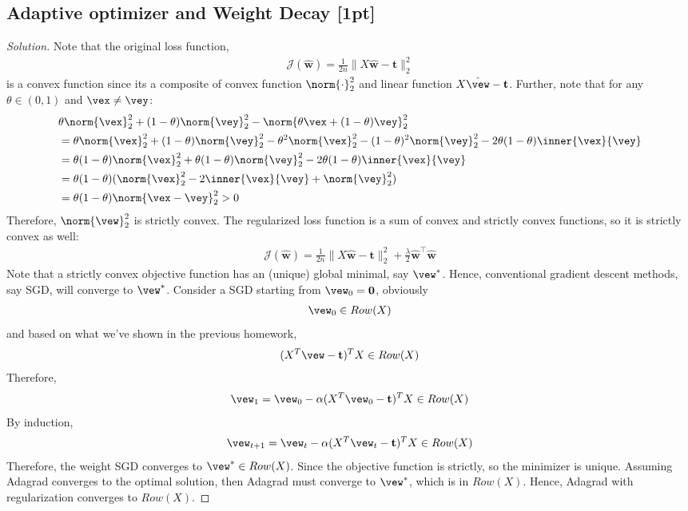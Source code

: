 \documentclass{article}
\begin{document}
	\subsection{Adaptive optimizer and Weight Decay [1pt]}
	\begin{proof}[Solution]
		Note that the original loss function,
		\begin{align}
			\mathcal{J}(\hat{\mathbf{w}})=\frac{1}{2 n}\|X \hat{\mathbf{w}}-\mathbf{t}\|_{2}^{2}
		\end{align}
		is a convex function since its a composite of convex function $\norm{\cdot}_2^2$ and linear function $X \hat{\vew} - \textbf{t}$. Further, note that for any $\theta \in (0, 1)$ and $\vex \neq \vey$:
		\begin{align}
			&\theta \norm{\vex}_2^2 + (1 - \theta) \norm{\vey}_2^2 - \norm{\theta \vex + (1 - \theta) \vey}_2^2 \\
			&= \theta \norm{\vex}_2^2 + (1 - \theta) \norm{\vey}_2^2
			- \theta^2 \norm{\vex}_2^2 - (1 - \theta)^2 \norm{\vey}_2^2 - 2 \theta(1 - \theta) \inner{\vex}{\vey} \\
			&= \theta(1 - \theta) \norm{\vex}_2^2 + \theta (1 - \theta) \norm{\vey}_2^2
			- 2 \theta(1 - \theta) \inner{\vex}{\vey} \\
			&= \theta (1 - \theta) (\norm{\vex}_2^2 - 2\inner{\vex}{\vey} + \norm{\vey}_2^2) \\
			&= \theta (1 - \theta) \norm{\vex - \vey}_2^2 > 0
		\end{align}
		Therefore, $\norm{\vew}_2^2$ is strictly convex. The regularized loss function is a sum of convex and strictly convex functions, so it is strictly convex as well:
		\begin{align}
			\mathcal{J}(\hat{\mathbf{w}})=\frac{1}{2 n}\|X \hat{\mathbf{w}}-\mathbf{t}\|_{2}^{2}+\frac{\lambda}{2} \hat{\mathbf{w}}^{\top} \hat{\mathbf{w}}
		\end{align}
		Note that a strictly convex objective function has an (unique) global minimal, say $\vew^*$. Hence, conventional gradient descent methods, say SGD, will converge to $\vew^*$. Consider a SGD starting from $\vew_0 = \textbf{0}$, obviously
		\begin{align}
			\vew_0 \in Row(X)
		\end{align}
		and based on what we've shown in the previous homework,
		\begin{align}
			(X^T \vew - \textbf{t})^T X \in Row(X)
		\end{align}
		Therefore,
		\begin{align}
			\vew_1 = \vew_0 - \alpha (X^T \vew_0 - \textbf{t})^T X \in Row(X)
		\end{align}
		By induction, 
		\begin{align}
			\vew_{t+1} = \vew_t - \alpha (X^T \vew_t - \textbf{t})^T X \in Row(X)
		\end{align}
		Therefore, the weight SGD converges to $\vew^* \in Row(X)$. Since the objective function is strictly, so the minimizer is unique. Assuming Adagrad converges to the optimal solution, then Adagrad must converge to $\vew^*$, which is in $Row(X)$. Hence, Adagrad with regularization converges to $Row(X)$.
	\end{proof}
	
\end{document}
